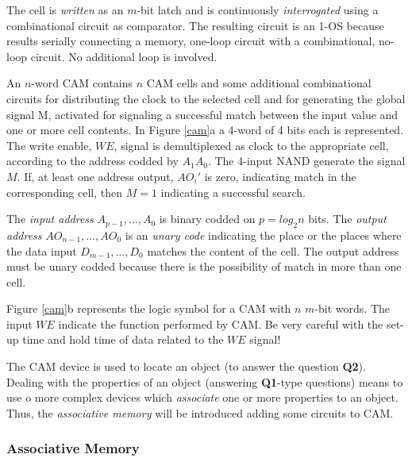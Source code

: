 The cell is {\em written} as an $m$-bit latch and is continuously
{\em interrogated} using a combinational circuit as comparator.
The resulting circuit is an 1-OS because results serially
connecting a memory, one-loop circuit with a combinational,
no-loop circuit. No additional loop is involved.

An $n$-word CAM contains $n$ CAM cells and some additional
combinational circuits for distributing the clock to the selected
cell and for generating the global signal M, activated for
signaling a successful match between the input value and one or
more cell contents. In Figure \ref{cam}a a 4-word of 4 bits each
is represented. The write enable, $WE$, signal is demultiplexed as
clock to the appropriate cell, according to the address codded by
$A_{1}A_{0}$. The 4-input NAND generate the signal $M$. If, at
least one address output, $AO_{i}'$ is zero, indicating match in
the corresponding cell, then $M = 1$ indicating a successful
search.


The {\em input address} $A_{p-1}, \ldots, A_{0}$ is binary codded
on $p = log_{2} n$ bits. The {\em output address} $AO_{n-1},
\ldots, AO_{0}$ is an {\em unary code} indicating the place or the
places where the data input $D_{m-1}, \ldots, D_{0}$ matches the
content of the cell. The output address must be unary codded
because there is the possibility of match in more than one cell.

Figure \ref{cam}b represents the logic symbol for a CAM with $n$
$m$-bit words. The input $WE$ indicate the function performed by
CAM. Be very careful with the set-up time and hold time of data
related to the $WE$ signal!

The CAM device is used to locate an object (to answer the question
{\bf Q2}). Dealing with the properties of an object (answering
{\bf Q1}-type questions) means to use o more complex devices which
{\em associate} one or more properties to an object. Thus, the
{\em associative memory} will be introduced adding some circuits
to CAM.


\subsubsection{Associative Memory}

